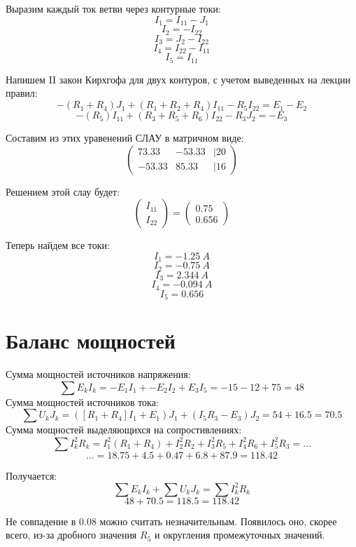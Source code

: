 \documentclass[14pt, a4paper]{article}
\begin{document}
    Выразим каждый ток ветви через контурные токи:
    $$I_1 = I_{11}-J_1$$
    $$I_2 = - I_22$$
    $$I_3 = J_2 - I_22$$
    $$I_4 = I_{22} - I_{11}$$
    $$I_5 = I_{11}$$

    Напишем II закон Кирхгофа для двух контуров, с учетом выведенных на лекции правил:
    $$-(R_1+R_4)J_1 + (R_1 + R_2 + R_4)I_{11} - R_5I_{22} = E_1 - E_2$$
    $$-(R_5)I_{11} + (R_3 + R_5 + R_6)I_{22} - R_3J_2 = -E_3$$

    Составим из этих уравенений СЛАУ в матричном виде:
    $$
    \begin{pmatrix}
        73.33 & -53.33 & | 20 \\
        -53.33 & 85.33 & | 16
    \end{pmatrix}
    $$

    Решением этой слау будет:
    $$
    \begin{pmatrix}
        I_{11} \\ I_22
    \end{pmatrix} = 
    \begin{pmatrix}
       0.75  \\ 0.656
    \end{pmatrix}
    $$

    Теперь найдем все токи:
        $$I_1 = -1.25 \ A$$
        $$I_2 = -0.75 \ A$$
        $$I_3 = 2.344 \ A$$
        $$I_4 = -0.094 \ A$$
        $$I_5 = 0.656$$

\section*{Баланс мощностей}
    Сумма мощностей источников напряжения:
    $$\sum E_k I_k = -E_1I_1 + -E_2I_2 + E_3I_5 = -15  - 12 + 75 = 48$$
    Сумма мощностей источников тока:
    $$\sum U_k J_k = ([R_1 + R_4]I_1 + E_1)J_1 + (I_5R_3 - E_3)J_2 = 54 + 16.5 = 70.5$$
    Сумма мощностей выделяющихся на сопростивлениях:
    $$\sum I_k^2 R_k = I_1^2(R_1 + R_4) + I_2^2R_2 + I_3^2R_5 + I_4^2 R_6 + I_5^2 R_3 =\dots $$
    $$ \dots= 18.75 + 4.5 + 0.47 + 6.8 + 87.9 = 118.42$$

    Получается:
    $$\sum E_k I_k + \sum U_k J_k = \sum I_k^2 R_k$$
    $$48 + 70.5 = 118.5 = 118.42$$
    
    Не совпадение в $0.08$ можно считать незначительным. Появилось оно, скорее всего, из-за дробного значения $R_5$ и
    округления промежуточных значений.
    
\end{document}
